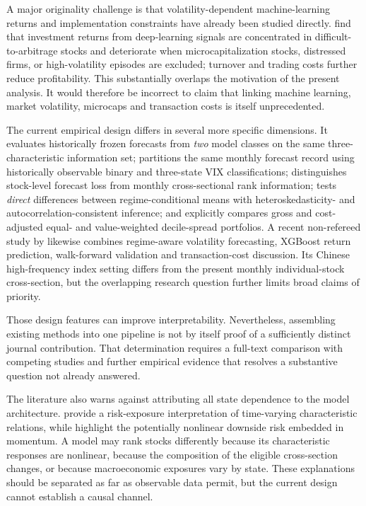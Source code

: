 A major originality challenge is that volatility-dependent machine-learning
returns and implementation constraints have already been studied directly.
\cite{AvramovChengMetzker2023} find that investment returns from deep-learning
signals are concentrated in difficult-to-arbitrage stocks and deteriorate
when microcapitalization stocks, distressed firms, or high-volatility
episodes are excluded; turnover and trading costs further reduce
profitability. This substantially overlaps the motivation of the present
analysis. It would therefore be incorrect to claim that linking machine
learning, market volatility, microcaps and transaction costs is itself
unprecedented.

The current empirical design differs in several more specific dimensions.
It evaluates historically frozen forecasts from \emph{two} model classes on
the same three-characteristic information set; partitions the same monthly
forecast record using historically observable binary and three-state VIX
classifications; distinguishes stock-level forecast loss from monthly
cross-sectional rank information; tests \emph{direct} differences between
regime-conditional means with heteroskedasticity- and
autocorrelation-consistent inference; and explicitly compares gross and
cost-adjusted equal- and value-weighted decile-spread portfolios.
A recent non-refereed study by \cite{FangSlepaczuk2026} likewise
combines regime-aware volatility forecasting, XGBoost return prediction,
walk-forward validation and transaction-cost discussion. Its Chinese
high-frequency index setting differs from the present monthly
individual-stock cross-section, but the overlapping research question
further limits broad claims of priority.

Those design features can improve interpretability. Nevertheless, assembling
existing methods into one pipeline is not by itself proof of a sufficiently
distinct journal contribution. That determination requires a full-text
comparison with competing studies and further empirical evidence that resolves
a substantive question not already answered.

The literature also warns against attributing all state dependence to
the model architecture. \cite{KellyPruittSu2019} provide a risk-exposure
interpretation of time-varying characteristic relations, while
\cite{DanielMoskowitz2016} highlight the potentially nonlinear downside
risk embedded in momentum. A model may rank stocks differently because
its characteristic responses are nonlinear, because the composition of the
eligible cross-section changes, or because macroeconomic exposures vary by
state. These explanations should be separated as far as observable data
permit, but the current design cannot establish a causal channel.

